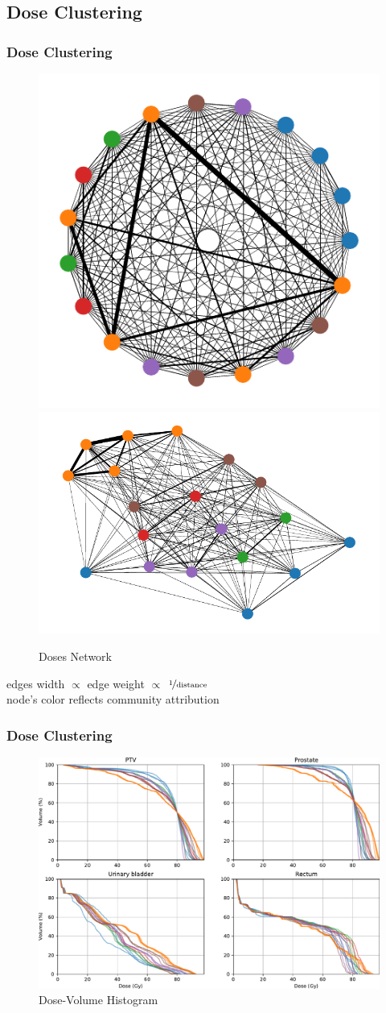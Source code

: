 \documentclass{beamer}
\begin{document}
	\subsection{Dose Clustering}
	\begin{frame}
		\frametitle{Dose Clustering}
		\begin{figure}
			\includegraphics[width=0.35\linewidth]{figures/graph.pdf}
			\includegraphics[width=0.54\linewidth]{figures/graph_bis.pdf}
			\caption{Doses Network}
		\end{figure}
		edges width $\propto$ edge weight $\propto$ $\nicefrac{\text{1}}{\text{distance}}$\\
		node's color reflects community attribution
	\end{frame}
	\begin{frame}
		\frametitle{Dose Clustering}
		\begin{figure}
			\includegraphics[width=\linewidth]{figures/dvh.pdf}
			\caption{Dose-Volume Histogram}
		\end{figure}
	\end{frame}
\end{document}
